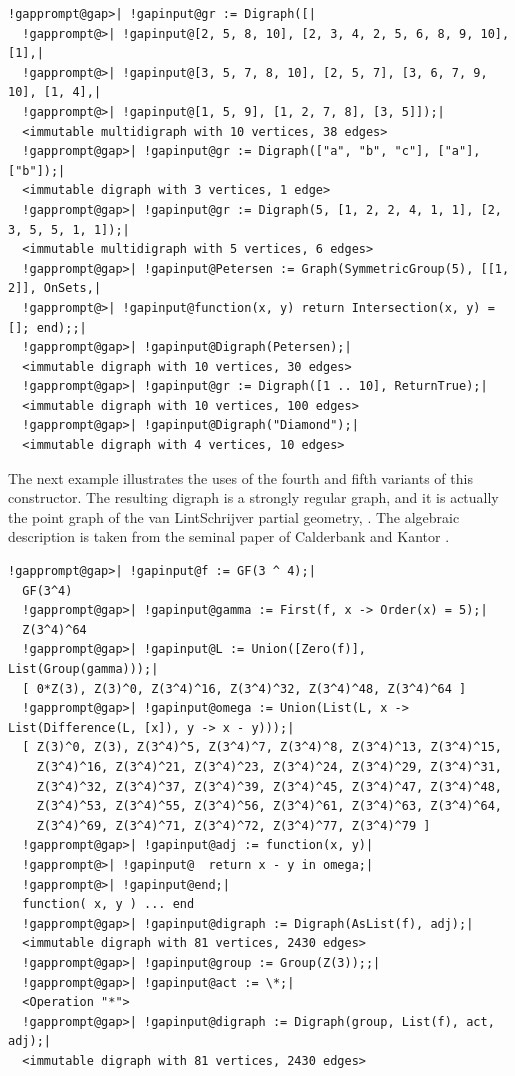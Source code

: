 \documentclass[a4paper,11pt]{report}
\begin{document}
{{{\begin{Verbatim}[commandchars=!@|,fontsize=\small,frame=single,label=Example]
  !gapprompt@gap>| !gapinput@gr := Digraph([|
  !gapprompt@>| !gapinput@[2, 5, 8, 10], [2, 3, 4, 2, 5, 6, 8, 9, 10], [1],|
  !gapprompt@>| !gapinput@[3, 5, 7, 8, 10], [2, 5, 7], [3, 6, 7, 9, 10], [1, 4],|
  !gapprompt@>| !gapinput@[1, 5, 9], [1, 2, 7, 8], [3, 5]]);|
  <immutable multidigraph with 10 vertices, 38 edges>
  !gapprompt@gap>| !gapinput@gr := Digraph(["a", "b", "c"], ["a"], ["b"]);|
  <immutable digraph with 3 vertices, 1 edge>
  !gapprompt@gap>| !gapinput@gr := Digraph(5, [1, 2, 2, 4, 1, 1], [2, 3, 5, 5, 1, 1]);|
  <immutable multidigraph with 5 vertices, 6 edges>
  !gapprompt@gap>| !gapinput@Petersen := Graph(SymmetricGroup(5), [[1, 2]], OnSets,|
  !gapprompt@>| !gapinput@function(x, y) return Intersection(x, y) = []; end);;|
  !gapprompt@gap>| !gapinput@Digraph(Petersen);|
  <immutable digraph with 10 vertices, 30 edges>
  !gapprompt@gap>| !gapinput@gr := Digraph([1 .. 10], ReturnTrue);|
  <immutable digraph with 10 vertices, 100 edges>
  !gapprompt@gap>| !gapinput@Digraph("Diamond");|
  <immutable digraph with 4 vertices, 10 edges>
\end{Verbatim}
 The next example illustrates the uses of the fourth and fifth variants of this
constructor. The resulting digraph is a strongly regular graph, and it is
actually the point graph of the van Lint\texttt{}Schrijver partial
geometry, \cite{vLS81}. The algebraic description is taken from the seminal paper of Calderbank and
Kantor \cite{CK86}. 
\begin{Verbatim}[commandchars=!@|,fontsize=\small,frame=single,label=Example]
  !gapprompt@gap>| !gapinput@f := GF(3 ^ 4);|
  GF(3^4)
  !gapprompt@gap>| !gapinput@gamma := First(f, x -> Order(x) = 5);|
  Z(3^4)^64
  !gapprompt@gap>| !gapinput@L := Union([Zero(f)], List(Group(gamma)));|
  [ 0*Z(3), Z(3)^0, Z(3^4)^16, Z(3^4)^32, Z(3^4)^48, Z(3^4)^64 ]
  !gapprompt@gap>| !gapinput@omega := Union(List(L, x -> List(Difference(L, [x]), y -> x - y)));|
  [ Z(3)^0, Z(3), Z(3^4)^5, Z(3^4)^7, Z(3^4)^8, Z(3^4)^13, Z(3^4)^15, 
    Z(3^4)^16, Z(3^4)^21, Z(3^4)^23, Z(3^4)^24, Z(3^4)^29, Z(3^4)^31, 
    Z(3^4)^32, Z(3^4)^37, Z(3^4)^39, Z(3^4)^45, Z(3^4)^47, Z(3^4)^48, 
    Z(3^4)^53, Z(3^4)^55, Z(3^4)^56, Z(3^4)^61, Z(3^4)^63, Z(3^4)^64, 
    Z(3^4)^69, Z(3^4)^71, Z(3^4)^72, Z(3^4)^77, Z(3^4)^79 ]
  !gapprompt@gap>| !gapinput@adj := function(x, y)|
  !gapprompt@>| !gapinput@  return x - y in omega;|
  !gapprompt@>| !gapinput@end;|
  function( x, y ) ... end
  !gapprompt@gap>| !gapinput@digraph := Digraph(AsList(f), adj);|
  <immutable digraph with 81 vertices, 2430 edges>
  !gapprompt@gap>| !gapinput@group := Group(Z(3));;|
  !gapprompt@gap>| !gapinput@act := \*;|
  <Operation "*">
  !gapprompt@gap>| !gapinput@digraph := Digraph(group, List(f), act, adj);|
  <immutable digraph with 81 vertices, 2430 edges>
\end{Verbatim}
 }

}}
\end{document}
